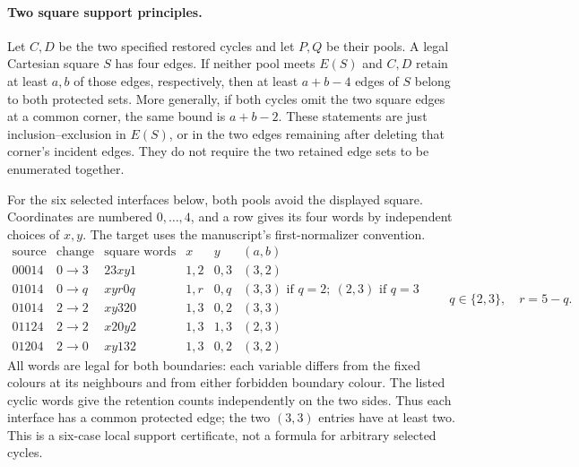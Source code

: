 \paragraph{Two square support principles.}
Let $C,D$ be the two specified restored cycles and let $P,Q$ be
their pools. A legal Cartesian square $S$ has four edges.
If neither pool meets $E(S)$ and $C,D$ retain at least $a,b$
of those edges, respectively, then at least $a+b-4$ edges of $S$
belong to both protected sets. More generally, if both cycles
omit the two square edges at a common corner, the same bound is
$a+b-2$. These statements are just inclusion--exclusion in
$E(S)$, or in the two edges remaining after deleting that corner's
incident edges. They do not require the two retained edge sets
to be enumerated together.

For the six selected interfaces below, both pools avoid the
displayed square. Coordinates are numbered $0,\ldots,4$, and a
row gives its four words by independent choices of $x,y$.
The target uses the manuscript's first-normalizer convention.
\[
\begin{array}{c|c|c|c|c|c}
\text{source}&\text{change}&\text{square words}&x&y&(a,b)\\\hline
00014&0\to3&23xy1&1,2&0,3&(3,2)\\
01014&0\to q&xy r0q&1,r&0,q&(3,3)\text{ if }q=2;\ (2,3)\text{ if }q=3\\
01014&2\to2&xy320&1,3&0,2&(3,3)\\
01124&2\to2&x20y2&1,3&1,3&(2,3)\\
01204&2\to0&xy132&1,3&0,2&(3,2)
\end{array}
\qquad q\in\{2,3\},\quad r=5-q.
\]
All words are legal for both boundaries: each variable differs
from the fixed colours at its neighbours and from either
forbidden boundary colour. The listed cyclic words give the
retention counts independently on the two sides. Thus each
interface has a common protected edge; the two $(3,3)$ entries
have at least two. This is a six-case local support certificate,
not a formula for arbitrary selected cycles.

